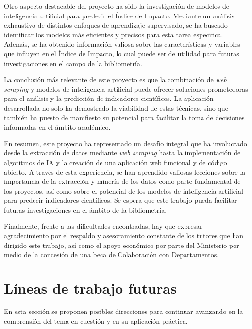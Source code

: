 Otro aspecto destacable del proyecto ha sido la investigación de modelos de inteligencia artificial para predecir el Índice de Impacto. Mediante un análisis exhaustivo de distintos enfoques de aprendizaje supervisado, se ha buscado identificar los modelos más eficientes y precisos para esta tarea específica. Además, se ha obtenido información valiosa sobre las características y variables que influyen en el Índice de Impacto, lo cual puede ser de utilidad para futuras investigaciones en el campo de la bibliometría.

La conclusión más relevante de este proyecto es que la combinación de \textit{web scraping} y modelos de inteligencia artificial puede ofrecer soluciones prometedoras para el análisis y la predicción de indicadores científicos. La aplicación desarrollada no solo ha demostrado la viabilidad de estas técnicas, sino que también ha puesto de manifiesto su potencial para facilitar la toma de decisiones informadas en el ámbito académico. 

En resumen, este proyecto ha representado un desafío integral que ha involucrado desde la extracción de datos mediante \textit{web scraping} hasta la implementación de algoritmos de IA y la creación de una aplicación web funcional y de código abierto. A través de esta experiencia, se han aprendido valiosas lecciones sobre la importancia de la extracción y minería de los datos como parte fundamental de los proyectos, así como sobre el potencial de los modelos de inteligencia artificial para predecir indicadores científicos. Se espera que este trabajo pueda facilitar futuras investigaciones en el ámbito de la bibliometría.

Finalmente, frente a las dificultades encontradas, hay que expresar agradecimiento por el respaldo y asesoramiento constante de los tutores que han dirigido este trabajo, así como el apoyo económico por parte del Ministerio por medio de la concesión de una beca de Colaboración con Departamentos. 



\section{Líneas de trabajo futuras}
En esta sección se proponen posibles direcciones para continuar avanzando en la comprensión del tema en cuestión y en su aplicación práctica.

